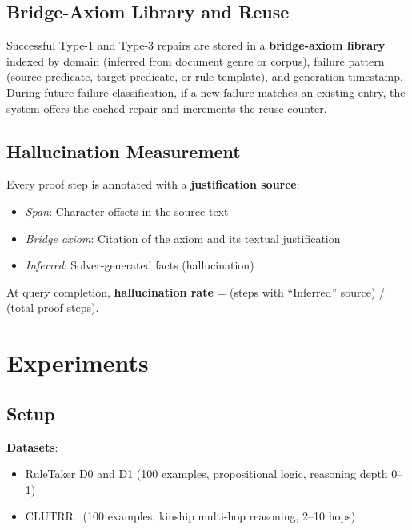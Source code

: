 \documentclass[11pt,letterpaper]{article}
\begin{document}
\subsection{Bridge-Axiom Library and Reuse}

Successful Type-1 and Type-3 repairs are stored in a \textbf{bridge-axiom library}
indexed by domain (inferred from document genre or corpus), failure pattern (source
predicate, target predicate, or rule template), and generation timestamp. During
future failure classification, if a new failure matches an existing entry, the system
offers the cached repair and increments the reuse counter.

\subsection{Hallucination Measurement}

Every proof step is annotated with a \textbf{justification source}:
\begin{itemize}
  \item \textit{Span}: Character offsets in the source text
  \item \textit{Bridge axiom}: Citation of the axiom and its textual justification
  \item \textit{Inferred}: Solver-generated facts (hallucination)
\end{itemize}
At query completion, \textbf{hallucination rate} = (steps with ``Inferred'' source)
/ (total proof steps).

\section{Experiments}
\label{sec:experiments}

\subsection{Setup}

\textbf{Datasets}:
\begin{itemize}
  \item RuleTaker D0 and D1 (100 examples, propositional logic, reasoning depth 0--1)
  \item CLUTRR~\citep{Sinha2019} (100 examples, kinship multi-hop reasoning, 2--10 hops)
\end{itemize}
\end{document}
